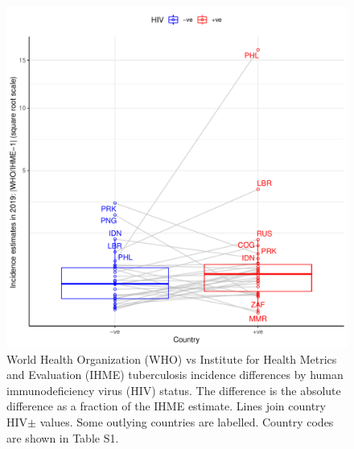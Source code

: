 \documentclass[12pt]{article}
\begin{document}
\begin{figure}
  \centering
  \includegraphics[width=1\textwidth]{../plots/aF9.pdf}
  \caption[WHO vs IHME incidence differences by HIV status]{World Health Organization (WHO) vs Institute for Health Metrics
    and Evaluation (IHME) tuberculosis
    incidence differences by human immunodeficiency virus (HIV) status. The difference is the absolute
    difference as a fraction of the IHME estimate. Lines join country HIV$\pm$
    values. Some outlying countries are labelled. Country codes are shown in
    Table S1. }
\end{figure}

\FloatBarrier
\end{document}
